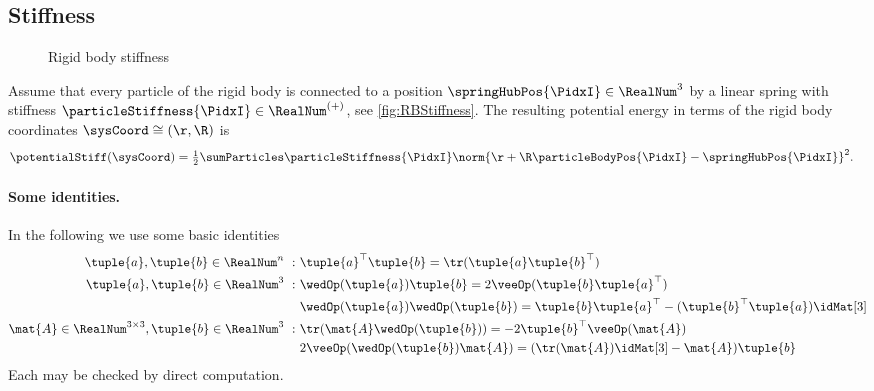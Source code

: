 \subsection{Stiffness}\label{sec:RBStiffness}
\begin{figure}[ht]
 \centering
 
 \caption{Rigid body stiffness}
 \label{fig:RBStiffness}
\end{figure}
Assume that every particle of the rigid body is connected to a position $\springHubPos{\PidxI} \in \RealNum^3$ by a linear spring with stiffness $\particleStiffness{\PidxI} \in\RealNum^{(+)}$, see \autoref{fig:RBStiffness}.
The resulting potential energy in terms of the rigid body coordinates $\sysCoord \cong (\r, \R)$ is
\begin{align}\label{eq:RBStiffnessPotential}
 \potentialStiff(\sysCoord) &= \tfrac{1}{2} \sumParticles \particleStiffness{\PidxI} \norm{\r + \R \particleBodyPos{\PidxI} - \springHubPos{\PidxI}}^2.
\end{align}

\paragraph{Some identities.}
In the following we use some basic identities
\begin{subequations}
\begin{align}
 \tuple{a}, \tuple{b} \in \RealNum^{n}  \ : \ &\tuple{a}^\top \tuple{b} = \tr(\tuple{a}\tuple{b}^\top)
\\
 \tuple{a}, \tuple{b} \in \RealNum^{3}  \ : \ &\wedOp(\tuple{a}) \tuple{b} = 2\veeOp(\tuple{b} \tuple{a}^\top)
\\
 &\wedOp(\tuple{a}) \wedOp(\tuple{b}) = \tuple{b} \tuple{a}^\top - (\tuple{b}^\top \tuple{a}) \idMat[3]
\\
 \mat{A}\in\RealNum^{3\times3}, \tuple{b}\in\RealNum^3 \ : \ &\tr(\mat{A} \wedOp(\tuple{b})) = -2 \tuple{b}^\top \veeOp(\mat{A})
\\
 &2\veeOp(\wedOp(\tuple{b}) \mat{A}) = (\tr(\mat{A})\idMat[3] - \mat{A}) \tuple{b}
\end{align} 
\end{subequations}
Each may be checked by direct computation.


